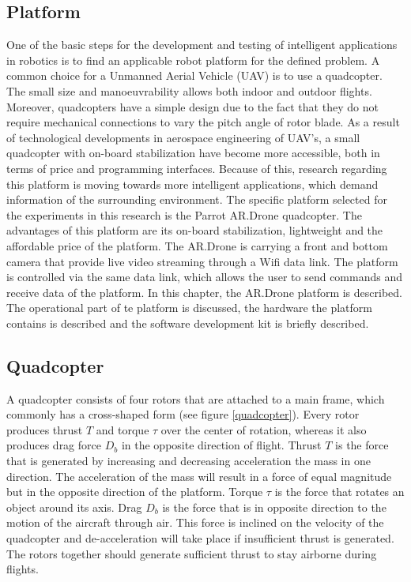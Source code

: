 \documentclass[a4paper]{article}
\begin{document}
\begin{appendices}
\newpage

\section{Platform}
\label{PLATFORM}
One of the basic steps for the development and testing of intelligent applications in robotics is to find an applicable robot platform for the defined problem. A common choice for a Unmanned Aerial Vehicle (UAV) is to use a quadcopter. The small size and manoeuvrability allows both indoor and outdoor flights. Moreover, quadcopters have a simple design due to the fact that they do not require mechanical connections to vary the pitch angle of rotor blade.
As a result of technological developments in aerospace engineering of UAV's, a small quadcopter with on-board stabilization have become more accessible, both in terms of price and programming interfaces. Because of this, research regarding this platform is moving towards more intelligent applications, which demand information of the surrounding environment. The specific platform selected for the experiments in this research is the Parrot AR.Drone quadcopter. The advantages of this platform are its on-board stabilization, lightweight and the affordable price of the platform. The AR.Drone is carrying a front and bottom camera that provide live video streaming through a Wifi data link.  The platform is controlled via the same data link, which allows the user to send commands and receive data of the platform.
In this chapter, the AR.Drone platform is described. The operational part of te platform is discussed, the hardware the platform contains is described and the software development kit is briefly described.

\subsection{Quadcopter}
A quadcopter consists of four rotors that are attached to a main frame, which commonly has a cross-shaped form (see figure \ref{quadcopter}). Every rotor produces thrust $T$ and torque $\tau$ over the center of rotation, whereas it also produces drag force $D_b$ in the opposite direction of flight. Thrust $T$ is the force that is generated by increasing and decreasing acceleration the mass in one direction. The acceleration of the mass will result in a force of equal magnitude but in the opposite direction of the platform. Torque $\tau$ is the force that rotates an object around its axis. Drag $D_b$ is the force that is in opposite direction to the motion of the aircraft through air. This force is inclined on the velocity of the quadcopter and de-acceleration will take place if insufficient thrust is generated. The rotors together should generate sufficient thrust to stay airborne during flights.


\end{appendices}
\end{document}
